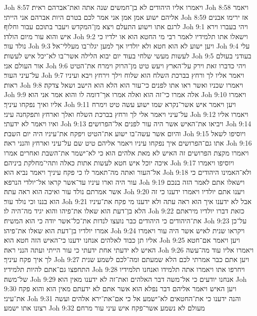 Joh 8:57  ויאמרו אליו היהודים לא בן־חמשים שנה אתה ואת־אברהם ראית׃
Joh 8:58  ויאמר אליהם ישוע אמן אמן אני אמר לכם בטרם היות אברהם אני הייתי׃
Joh 8:59  אז ירימו אבנים לרגם אתו וישוע התעלם ויצא מן־המקדש ויעבר בתוכם עבור וחלוף׃
Joh 9:1  ויהי בעברו וירא איש והוא עור מיום הולדו׃
Joh 9:2  וישאלו אתו תלמידיו לאמר רבי מי החטא הוא או ילדיו כי נולד עור׃
Joh 9:3  ויען ישוע לא הוא חטא ולא יולדיו אך למען יגלו־בו מעללי־אל׃
Joh 9:4  עלי לעשות מעשי שלחי בעוד יום יבוא הלילה אשר־בו לא־יכל איש לעשות׃
Joh 9:5  בעודני בעולם אור העולם אני׃
Joh 9:6  ויהי כדברו זאת וירק על־הארץ ויעש טיט מן־הרוק וימרח את־הטיט על־עיני העור׃
Joh 9:7  ויאמר אליו לך ורחץ בברכת השלח הוא שלוח וילך וירחץ ויבא ועיניו ראות׃
Joh 9:8  ויאמרו שכניו ואשר ראו אתו לפנים כי־עור הוא הלא הוא הישב ושאל צדקה׃
Joh 9:9  אלה אמרו כי־זה הוא ואלה אמרו אך־דומה לו והוא אמר אני הוא׃
Joh 9:10  ויאמרו אליו ואיך נפקחו עיניך׃
Joh 9:11  ויען ויאמר איש אשר־נקרא שמו ישוע עשה טיט וימרח על־עיני ויאמר אלי לך ורחץ בברכת השלח ואלך וארחץ ותפקחנה עיני׃
Joh 9:12  ויאמרו אליו ואיו ויאמר לא ידעתי׃
Joh 9:13  ויביאו את־האיש אשר היה עור לפנים אל־הפרושים׃
Joh 9:14  והיום אשר עשה־בו ישוע את־הטיט ויפקח את־עיניו היה יום השבת׃
Joh 9:15  ויוסיפו לשאל אתו גם־הפרושים איך נפקחו עיניו ויאמר אליהם טיט שם על־עיני וארחץ והנני ראה׃
Joh 9:16  ויאמרו מקצת הפרושים זה האיש לא מאת אלהים הוא כי לא־ישמר את־השבת ואחרים אמרו איכה יוכל איש חטא לעשות אתות כאלה ותהי־מחלקת ביניהם׃
Joh 9:17  ויוסיפו ויאמרו אל־העור ואתה מה־תאמר לו כי פקח עיניך ויאמר נביא הוא׃
Joh 9:18  ולא־האמינו היהודים כי עור היה וארו עיניו עד־אשר קראו אל־יולדי הנרפא׃
Joh 9:19  וישאלו אתם לאמר הזה בנכם אשר אמרתם נולד עור ואיכה הוא ראה עתה׃
Joh 9:20  ויענו אתם יולדיו ויאמרו ידענו כי זה הוא בננו וכי נולד עור׃
Joh 9:21  אבל לא ידענו איך הוא ראה עתה ולא ידענו מי פקח את־עיניו הלא בן־דעת הוא שאלו את־פיהו והוא יגיד מה־היה לו׃
Joh 9:22  כזאת דברו יולדיו מיראתם את־היהודים כי היהודים כבר נועצו לנדות את־כל־אשר יודה כי הוא המשיח׃
Joh 9:23  על־כן אמרו יולדיו בן־דעת הוא שאלו את־פיהו׃
Joh 9:24  ויקראו שנית לאיש אשר היה עור ויאמרו אליו תן כבוד לאלהים אנחנו ידענו כי־האיש הזה חטא הוא׃
Joh 9:25  ויען ויאמר אם־חטא האיש לא ידעתי אחת ידעתי כי עור הייתי ועתה הנני ראה׃
Joh 9:26  ויאמרו אליו עוד מה־עשה לך איך פקח עיניך׃
Joh 9:27  ויען אתם כבר אמרתי לכם הלא שמעתם ומה־לכם לשמע שנית התחפצו גם־אתם להיות תלמידיו׃
Joh 9:28  ויחרפו אתו ויאמרו אתה תלמידו ואנחנו תלמידיו של־משה׃
Joh 9:29  אנחנו יודעים כי אל־משה דבר האלהים ואת־זה לא ידענו מאין הוא׃
Joh 9:30  ויען האיש ויאמר אליהם דבר נפלא הוא אשר אתם לא ידעתם מאין הוא והוא פקח את־עיני׃
Joh 9:31  והנה ידענו כי את־החטאים לא־ישמע אל כי אם־את־ירא אלהים ועשה רצונו אתו ישמע׃
Joh 9:32  מעולם לא נשמע אשר־פקח איש עיני עור מרחם׃
